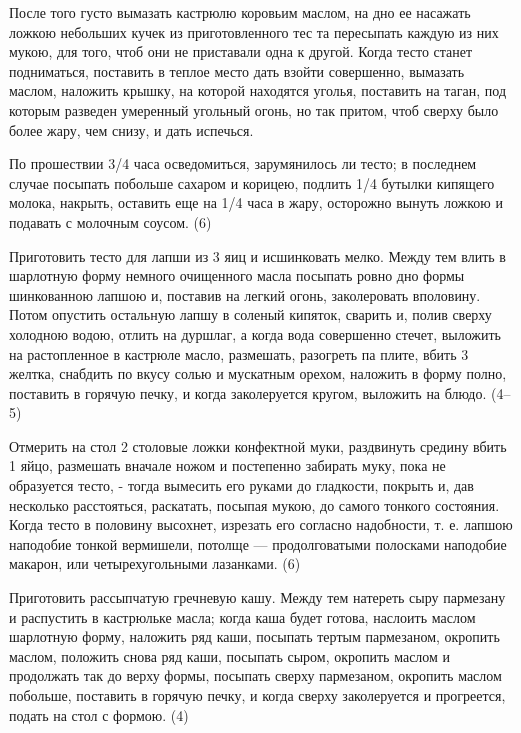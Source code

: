 После того густо вымазать кастрюлю коровьим маслом, на дно ее насажать ложкою небольших кучек из приготовленного тес та пересыпать каждую из них мукою, для того, чтоб они не приставали одна к другой. Когда тесто станет подниматься, поставить в теплое место дать взойти совершенно, вымазать маслом, наложить крышку, на которой находятся уголья, поставить на таган, под которым разведен умеренный угольный огонь, но так притом, чтоб сверху было более жару, чем снизу, и дать испечься. 

По прошествии 3/4 часа осведомиться, зарумянилось ли тесто; в последнем случае посыпать побольше сахаром и корицею, подлить 1/4 бутылки кипящего молока, накрыть, оставить еще на 1/4 часа в жару, осторожно вынуть ложкою и подавать с молочным соусом. (6) 


Приготовить тесто для лапши из 3 яиц и исшинковать мелко. Между тем влить в шарлотную форму немного очищенного масла посыпать ровно дно формы шинкованною лапшою и, поставив на легкий огонь, заколеровать вполовину. Потом опустить остальную лапшу в соленый кипяток, сварить и, полив сверху холодною водою, отлить на дуршлаг, а когда вода совершенно стечет, выложить на растопленное в кастрюле масло, размешать, разогреть па плите, вбить 3 желтка, снабдить по вкусу солью и мускатным орехом, наложить в форму полно, поставить в горячую печку, и когда заколеруется кругом, выложить на блюдо. (4--5) 


Отмерить на стол 2 столовые ложки конфектной муки, раздвинуть средину вбить 1 яйцо, размешать вначале ножом и постепенно забирать муку, пока не образуется тесто, - тогда вымесить его руками до гладкости, покрыть и, дав несколько расстояться, раскатать, посыпая мукою, до самого тонкого состояния. Когда тесто в половину высохнет, изрезать его согласно надобности, т. е. лапшою наподобие тонкой вермишели, потолще — продолговатыми полосками наподобие макарон, или четырехугольными лазанками. (6) 


Приготовить рассыпчатую гречневую кашу. Между тем натереть сыру пармезану и распустить в кастрюльке масла; когда каша будет готова, наслоить маслом шарлотную форму, наложить ряд каши, посыпать тертым пармезаном, окропить маслом, положить снова ряд каши, посыпать сыром, окропить маслом и продолжать так до верху формы, посыпать сверху пармезаном, окропить маслом побольше, поставить в горячую печку, и когда сверху заколеруется и прогреется, подать на стол с формою. (4) 

